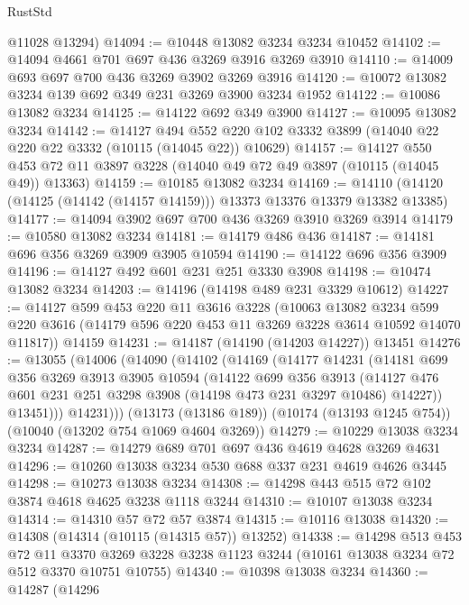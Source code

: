 \begin{lexlean}{RustStd}
\begin{coremodule}
      @11028
      @13294)
@14094 := @10448 @13082 @3234 @3234 @10452
@14102 := @14094 @4661 @701 @697 @436 @3269 @3916 @3269 @3910
@14110 := @14009 @693 @697 @700 @436 @3269 @3902 @3269 @3916
@14120 := @10072 @13082 @3234 @139 @692 @349 @231 @3269 @3900 @3234 @1952
@14122 := @10086 @13082 @3234
@14125 := @14122 @692 @349 @3900
@14127 := @10095 @13082 @3234
@14142 := @14127
    @494
    @552
    @220
    @102
    @3332
    @3899
    (@14040 @22 @220 @22 @3332 (@10115 (@14045 @22)) @10629)
@14157 := @14127
    @550
    @453
    @72
    @11
    @3897
    @3228
    (@14040 @49 @72 @49 @3897 (@10115 (@14045 @49)) @13363)
@14159 := @10185 @13082 @3234
@14169 := @14110 (@14120 (@14125 (@14142 (@14157 @14159))) @13373 @13376 @13379 @13382 @13385)
@14177 := @14094 @3902 @697 @700 @436 @3269 @3910 @3269 @3914
@14179 := @10580 @13082 @3234
@14181 := @14179 @486 @436
@14187 := @14181 @696 @356 @3269 @3909 @3905 @10594
@14190 := @14122 @696 @356 @3909
@14196 := @14127 @492 @601 @231 @251 @3330 @3908
@14198 := @10474 @13082 @3234
@14203 := @14196 (@14198 @489 @231 @3329 @10612)
@14227 := @14127
    @599
    @453
    @220
    @11
    @3616
    @3228
    (@10063
      @13082
      @3234
      @599
      @220
      @3616
      (@14179 @596 @220 @453 @11 @3269 @3228 @3614 @10592 @14070 @11817))
    @14159
@14231 := @14187 (@14190 (@14203 @14227)) @13451
@14276 := @13055
    (@14006
      (@14090
        (@14102
          (@14169
            (@14177
              @14231
              (@14181
                @699
                @356
                @3269
                @3913
                @3905
                @10594
                (@14122
                  @699
                  @356
                  @3913
                  (@14127 @476 @601 @231 @251 @3298 @3908 (@14198 @473 @231 @3297 @10486) @14227))
                @13451)))
          @14231)))
    (@13173 (@13186 @189))
    (@10174 (@13193 @1245 @754))
    (@10040 (@13202 @754 @1069 @4604 @3269))
@14279 := @10229 @13038 @3234 @3234
@14287 := @14279 @689 @701 @697 @436 @4619 @4628 @3269 @4631
@14296 := @10260 @13038 @3234 @530 @688 @337 @231 @4619 @4626 @3445
@14298 := @10273 @13038 @3234
@14308 := @14298 @443 @515 @72 @102 @3874 @4618 @4625 @3238 @1118 @3244
@14310 := @10107 @13038 @3234
@14314 := @14310 @57 @72 @57 @3874
@14315 := @10116 @13038
@14320 := @14308 (@14314 (@10115 (@14315 @57)) @13252)
@14338 := @14298
    @513
    @453
    @72
    @11
    @3370
    @3269
    @3228
    @3238
    @1123
    @3244
    (@10161 @13038 @3234 @72 @512 @3370 @10751 @10755)
@14340 := @10398 @13038 @3234
@14360 := @14287
    (@14296

\end{coremodule}
\end{lexlean}
